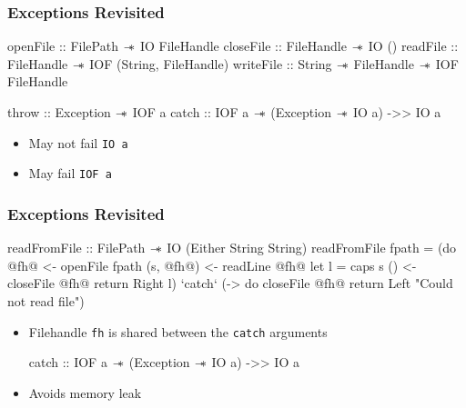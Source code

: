 \begin{frame}[fragile, c]
  \frametitle{Exceptions Revisited}
  \begin{center}
    \begin{haskell}
          openFile :: FilePath $\mathrel{-\mkern-6mu*}$ IO FileHandle
          closeFile :: FileHandle $\mathrel{-\mkern-6mu*}$ IO ()
          readFile :: FileHandle $\mathrel{-\mkern-6mu*}$ IOF (String, FileHandle)
          writeFile :: String $\mathrel{-\mkern-6mu*}$ FileHandle $\mathrel{-\mkern-6mu*}$ IOF FileHandle

          throw :: Exception $\mathrel{-\mkern-6mu*}$ IOF a
          catch :: IOF a $\mathrel{-\mkern-6mu*}$ (Exception $\mathrel{-\mkern-6mu*}$ IO a) ->> IO a
          \end{haskell}
\begin{itemize}
\item May not fail \texttt{IO a}
\item May fail \texttt{IOF a}
\end{itemize}
\end{center}
\end{frame}

\begin{frame}[fragile, c]
  \frametitle{Exceptions Revisited}
  \begin{center}
    \begin{haskell}
          readFromFile :: FilePath $\mathrel{-\mkern-6mu*}$ IO (Either String String)
          readFromFile fpath =
          (do @fh@  <- openFile fpath
             (s, @fh@)  <- readLine @fh@
             let l = caps s
             () <- closeFile @fh@
             return \dollar Right l) `catch`
                     (\e -> do closeFile @fh@
                               return \dollar Left "Could not read file")
                        \end{haskell}
                      \end{center}
     \begin{itemize}
     \item Filehandle \texttt{fh} is shared between the \texttt{catch} arguments
       \begin{haskell}
         catch :: IOF a $\mathrel{-\mkern-6mu*}$ (Exception $\mathrel{-\mkern-6mu*}$ IO a) ->> IO a
       \end{haskell}
     \item Avoids memory leak
\end{itemize}
\end{frame}


